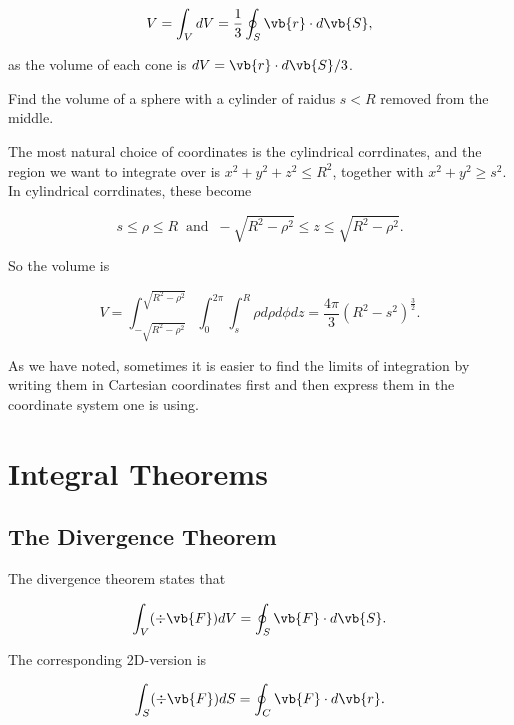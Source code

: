 \documentclass[english,a4paper,12pt]{report}
\begin{document}
\begin{equation}
	V = \int_{V}^{} dV = \frac{1}{3} \oint_{S} \vb{r} \cdot d\vb{S}, 
\end{equation}

as the volume of each cone is \(dV =  \vb{r} \cdot d\vb{S} /3 \). 


{Find the volume of a sphere with a cylinder of raidus \(s < R\) removed from the middle. }
{The most natural choice of coordinates is the cylindrical corrdinates, and the region we want to integrate over is \(x^2+y^2+z^2 \le R^2\), together with \(x^2+y^2 \ge s ^2\). In cylindrical corrdinates, these become 

\begin{equation}
	s \le \rho \le R ~\text { and }~ -\sqrt{R^2-\rho ^2} \le z \le \sqrt{R^2-\rho ^2}. 
\end{equation}

So the volume is

\begin{equation}
	V = \int_{-\sqrt{R^2-\rho ^2} }^{\sqrt{R^2-\rho ^2} } \int_{0}^{2\pi } \int_{s}^{R} \rho d\rho d \phi dz = \frac{4\pi }{3} (R^2-s ^2)^{\frac{3}{2} }.       
\end{equation}

As we have noted, sometimes it is easier to find the limits of integration by writing them in Cartesian coordinates first and then express them in the coordinate system one is using.
} 


\section{Integral Theorems}

\subsection{The Divergence Theorem}
The divergence theorem states that

\begin{equation} \label{divthmm} 
	\int _{V}(\div{\vb{F} } )dV = \oint_{S} \vb{F} \cdot d\vb{S} .
\end{equation}

The corresponding 2D-version is 

\begin{equation}
	\int_{S}^{} (\div{\vb{F} } ) dS = \oint_{C} \vb{F} \cdot d\vb{r} . 
\end{equation}
\end{document}
